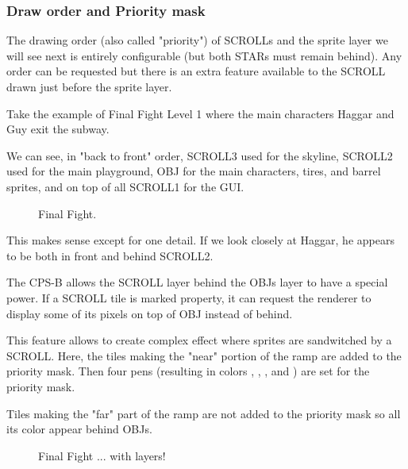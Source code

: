 \subsubsection{Draw order and Priority mask}


The drawing order (also called "priority") of SCROLLs and the sprite layer we will see next is entirely configurable (but both STARs must remain behind). Any order can be requested but there is an extra feature available to the SCROLL drawn just before the sprite layer.

Take the example of Final Fight Level 1 where the main characters Haggar and Guy exit the subway. 

We can see, in "back to front" order,   SCROLL3 used for the skyline,  SCROLL2 used for the main playground,  OBJ for the main characters, tires, and barrel sprites, and on top of all  SCROLL1 for the GUI.


\vfill
\begin{figure}[!b]
 \caption*{Final Fight.}%
 \end{figure}%
\pagebreak


This makes sense except for one detail. If we look closely at Haggar, he appears to be both in front and behind SCROLL2.

The CPS-B allows the SCROLL layer behind the OBJs layer to have a special power. If a SCROLL tile is marked property, it can request the renderer to display some of its pixels on top of OBJ instead of behind.

This feature allows to create complex effect where sprites are sandwitched by a SCROLL. Here, the tiles making the "near" portion of the ramp are added to the priority mask. Then four pens (resulting in colors  ,  ,  , and ) are set for the priority mask.

Tiles making the "far" part of the ramp are not added to the priority mask so all its color appear behind OBJs.

\vfill
\begin{figure}[!b]
 \caption*{Final Fight ... with layers!}%
 \end{figure}%
\pagebreak

